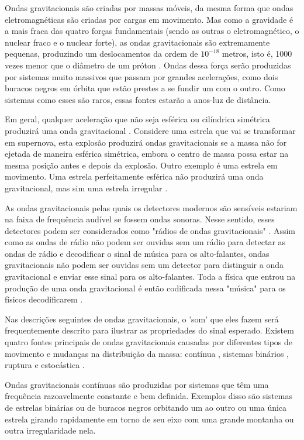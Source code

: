 Ondas gravitacionais são criadas por massas móveis, da mesma forma que ondas eletromagnéticas são criadas por cargas em movimento. Mas como a gravidade é a mais fraca das quatro forças fundamentais (sendo as outras o eletromagnético, o nuclear fraco e o nuclear forte), as ondas gravitacionais são extremamente pequenas, produzindo um deslocamentos da ordem de \(10^{-18}\) metros, isto é, 1000 vezes menor que o diâmetro de um próton \cite{abbott2016observation}. Ondas dessa força serão produzidas por sistemas muito massivos que passam por grandes acelerações, como dois buracos negros em órbita que estão prestes a se fundir um com o outro. Como sistemas como esses são raros, essas fontes estarão a anos-luz de distância.

Em geral, qualquer aceleração que não seja esférica ou cilíndrica simétrica produzirá uma onda gravitacional \cite{abbott2017gw170814}. Considere uma estrela que vai se transformar em supernova, esta explosão produzirá ondas gravitacionais se a massa não for ejetada de maneira esférica simétrica, embora o centro de massa possa estar na mesma posição antes e depois da explosão. Outro exemplo é uma estrela em movimento. Uma estrela perfeitamente esférica não produzirá uma onda gravitacional, mas sim uma estrela irregular \cite{abbott2017gw170817}.

As ondas gravitacionais pelas quais os detectores modernos são sensíveis estariam na faixa de frequência audível se fossem ondas sonoras. Nesse sentido, esses detectores podem ser considerados como "rádios de ondas gravitacionais" \cite{ligo2016gw151226}. Assim como as ondas de rádio não podem ser ouvidas sem um rádio para detectar as ondas de rádio e decodificar o sinal de música para os alto-falantes, ondas gravitacionais não podem ser ouvidas sem um detector para distinguir a onda gravitacional e enviar esse sinal para os alto-falantes. Toda a física que entrou na produção de uma onda gravitacional é então codificada nessa "música" para os físicos decodificarem \cite{ligo2016gw151226}. 

Nas descrições seguintes de ondas gravitacionais, o 'som' que eles fazem será frequentemente descrito para ilustrar as propriedades do sinal esperado. Existem quatro fontes principais de ondas gravitacionais causadas por diferentes tipos de movimento e mudanças na distribuição da massa: contínua , sistemas binários , ruptura e estocástica \cite{ligo2016gw151226}.

Ondas gravitacionais contínuas são produzidas por sistemas que têm uma frequência razoavelmente constante e bem definida. Exemplos disso são sistemas de estrelas binárias ou de buracos negros orbitando um ao outro ou uma única estrela girando rapidamente em torno de seu eixo com uma grande montanha ou outra irregularidade nela. 

